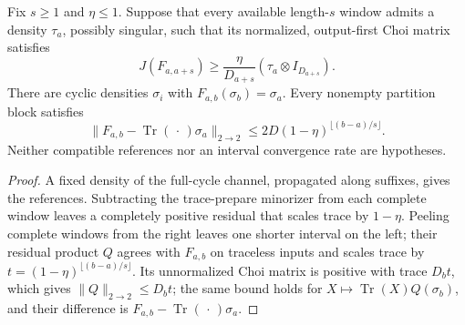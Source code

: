 \begin{lemma}
    \label{thm:ldp_rectangular_window_rate}
    \leanok
    Fix $s\ge1$ and $\eta\le1$. Suppose that every available length-$s$ window
    admits a density $\tau_a$, possibly singular, such that its normalized,
    output-first Choi matrix satisfies
    \[
        J(F_{a,a+s})\ge\frac{\eta}{D_{a+s}}(\tau_a\otimes I_{D_{a+s}}).
    \]
    There are cyclic densities $\sigma_i$ with
    $F_{a,b}(\sigma_b)=\sigma_a$. Every nonempty partition block satisfies
    \[
        \|F_{a,b}-\operatorname{Tr}(\,\cdot\,)\sigma_a\|_{2\to2}
        \le 2D(1-\eta)^{\lfloor(b-a)/s\rfloor}.
    \]
    Neither compatible references nor an interval convergence rate are hypotheses.
\end{lemma}
\begin{proof}\leanok
    A fixed density of the full-cycle channel, propagated along suffixes,
    gives the references. Subtracting the trace-prepare minorizer from each complete
    window leaves a completely positive residual that scales trace by $1-\eta$.
    Peeling complete windows from the right leaves one shorter interval on the left;
    their residual product $Q$ agrees with $F_{a,b}$ on traceless inputs and scales
    trace by $t=(1-\eta)^{\lfloor(b-a)/s\rfloor}$.
    Its unnormalized Choi matrix is positive with trace $D_b t$, which gives
    $\|Q\|_{2\to2}\le D_b t$; the same bound holds for
    $X\mapsto\operatorname{Tr}(X)Q(\sigma_b)$, and their difference is
    $F_{a,b}-\operatorname{Tr}(\,\cdot\,)\sigma_a$.
\end{proof}

